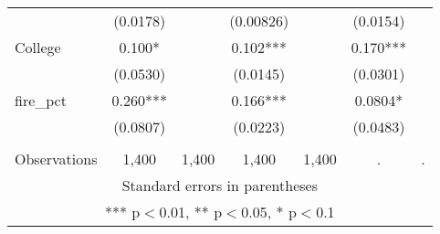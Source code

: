 \begin{tabular}{lcccccc}
 & (0.0178) &  & (0.00826) &  & (0.0154) &  \\
College & 0.100* &  & 0.102*** &  & 0.170*** &  \\
 & (0.0530) &  & (0.0145) &  & (0.0301) &  \\
fire\_pct & 0.260*** &  & 0.166*** &  & 0.0804* &  \\
 & (0.0807) &  & (0.0223) &  & (0.0483) &  \\
 &  &  &  &  &  &  \\
 Observations & 1,400 & 1,400 & 1,400 & 1,400 & . & . \\ \hline
\multicolumn{7}{c}{ Standard errors in parentheses} \\
\multicolumn{7}{c}{ *** p$<$0.01, ** p$<$0.05, * p$<$0.1} \\
\end{tabular}
